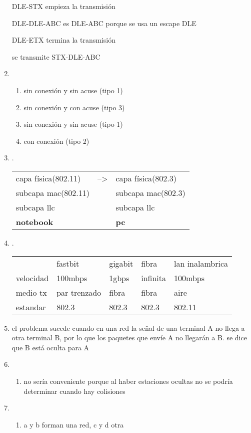 \documentclass[11pt]{article}
\begin{document}
\begin{enumerate}
DLE-STX empieza la transmisión

DLE-DLE-ABC es DLE-ABC porque se usa un escape DLE

DLE-ETX termina la transmisión

se transmite STX-DLE-ABC
\item \begin{enumerate}
\item sin conexión y sin acuse (tipo 1)
\item sin conexión y con acuse (tipo 3)
\item sin conexión y sin acuse (tipo 1)
\item con conexión (tipo 2)
\end{enumerate}
\item .
\begin{center}
\begin{tabular}{lll}
capa física(802.11) & --> & capa física(802.3)\\
subcapa mac(802.11) &  & subcapa mac(802.3)\\
subcapa llc &  & subcapa llc\\
\textbf{notebook} &  & \textbf{pc}\\
\end{tabular}
\end{center}
\item .
\begin{center}
\begin{tabular}{lllll}
 & fastbit & gigabit & fibra & lan inalambrica\\
velocidad & 100mbps & 1gbps & infinita & 100mbps\\
medio tx & par trenzado & fibra & fibra & aire\\
estandar & 802.3 & 802.3 & 802.3 & 802.11\\
\end{tabular}
\end{center}
\item el problema sucede cuando en una red la señal de una terminal A no llega a otra terminal B, por lo que los paquetes que envíe A no llegarán a B. se dice que B está oculta para A
\item \begin{enumerate}
\item no sería conveniente porque al haber estaciones ocultas no se podría determinar cuando hay colisiones
\end{enumerate}
\item \begin{enumerate}
\item a y b forman una red, c y d otra

\end{enumerate}
\end{enumerate}
\end{document}
